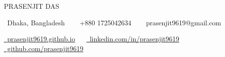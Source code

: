\begingroup
\centering

    {\huge\color{ACCENT_COLOR}\MakeUppercase{Prasenjit Das}}
    
    \raisebox{-0.1\height}\faHome\ Dhaka, Bangladesh
    ~~
    \small \raisebox{-0.1\height}\faPhone\ +880 1725042634 
    ~~ 
    \raisebox{-0.1\height}\faEnvelope\  prasenjit9619@gmail.com
    \\ \vspace{2pt} 

    \href{https://prasenjit9619.github.io/portfolio/}{\raisebox{-0.1\height}\faGlobe\ prasenjit9619.github.io}
    ~~
    \href{https://www.linkedin.com/in/prasenjit9619/}{\raisebox{-0.1\height}\faLinkedin\ linkedin.com/in/prasenjit9619}
    ~~
    \href{https://github.com/prasenjit9619}{\raisebox{-0.1\height}\faGithub\ github.com/prasenjit9619}

    
\par
\endgroup

